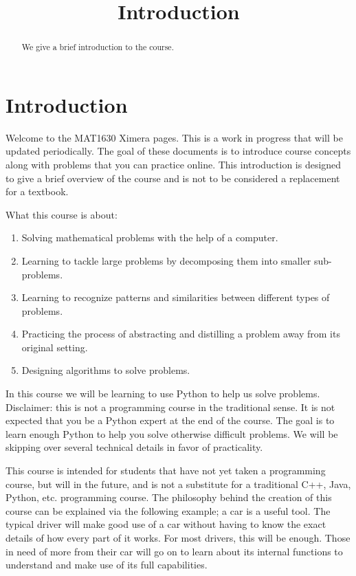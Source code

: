 \documentclass{ximera}
\title{Introduction}
\begin{document}
  
\begin{abstract}  
We give a brief introduction to the course.
\end{abstract}  
\maketitle

\section{Introduction}

Welcome to the MAT1630 Ximera pages. This is a work in progress that will be updated periodically. The goal of these documents is to introduce course concepts along with problems that you can practice online. 
This introduction is designed to give a brief overview of the course and is not to be considered a replacement for a textbook.

What this course is about:

\begin{enumerate}
	\item Solving mathematical problems with the help of a computer.
	\item Learning to tackle large problems by decomposing them into smaller sub-problems.
	\item Learning to recognize patterns and similarities between different types of problems.
	\item Practicing the process of abstracting and distilling a problem away from its original setting.
	\item Designing algorithms to solve problems.
\end{enumerate}

In this course we will be learning to use Python to help us solve problems. Disclaimer: this is not a programming course in the traditional sense. It is not expected that you be a Python expert at the end of the course. The goal is to learn enough Python to help you solve otherwise difficult problems. We will be skipping over several technical details in favor of practicality. 

This course is intended for students that have not yet taken a programming course, but will in the future, and is not a substitute for a traditional C++, Java, Python, etc. programming course. 
The philosophy behind the creation of this course can be explained via the following example; a car is a useful tool. The typical driver will make good use of a car without having to know the exact details of how every part of it works. For most drivers, this will be enough. Those in need of more from their car will go on to learn about its internal functions to understand and make use of its full capabilities. 
\end{document}
